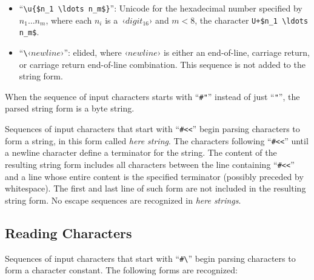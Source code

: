 \begin{itemize}
  \item ``\lstinline!\u{$n_1 \ldots n_m$}!'': Unicode for the hexadecimal number specified by $n_1 \ldots n_m$, where each $n_i$ is a~‹$digit_{16}$› and $m < 8$, the character \lstinline!U+$n_1 \ldots n_m$!.
  
  
  \item ``\lstinline!\!‹$newline$›'': elided, where ‹$newline$› is either an end-of-line, carriage return, or carriage return end-of-line combination. This sequence is not added to the string form.
\end{itemize}

When the sequence of input characters starts with ``\lstinline!#"!'' instead of just ``\lstinline!"!'', the parsed string form is a byte string. %

Sequences of input characters that start with ``\lstinline!#<<!'' begin parsing characters to form a string, in this form called {\em here string}. The characters following ``\lstinline!#<<!'' until a newline character define a terminator for the string. The content of the resulting string form includes all characters between the line containing ``\lstinline!#<<!'' and a line whose entire content is the specified terminator (possibly preceded by whitespace). The first and last line of such form are not included in the resulting string form. No escape sequences are recognized in {\em here strings}. %





\subsection{Reading Characters}
\label{subsec:aml-base-lang-reader-characters}

Sequences of input characters that start with ``\lstinline!#\!'' begin parsing characters to form a character constant. The following forms are recognized:

